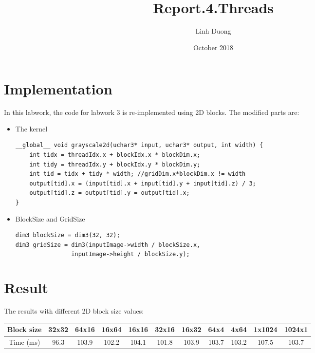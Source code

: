 \documentclass{article}
\title{Report.4.Threads}
\author{Linh Duong}
\date{October 2018}
\begin{document}
\maketitle

\section{Implementation}
In this labwork, the code for labwork 3 is re-implemented using 2D blocks. The modified parts are:

\begin{itemize}
    \item The kernel
    \begin{verbatim}
__global__ void grayscale2d(uchar3* input, uchar3* output, int width) {
    int tidx = threadIdx.x + blockIdx.x * blockDim.x;
    int tidy = threadIdx.y + blockIdx.y * blockDim.y;
    int tid = tidx + tidy * width; //gridDim.x*blockDim.x != width
    output[tid].x = (input[tid].x + input[tid].y + input[tid].z) / 3;
    output[tid].z = output[tid].y = output[tid].x;
}
    \end{verbatim}
    \item BlockSize and GridSize
    \begin{verbatim}
dim3 blockSize = dim3(32, 32);
dim3 gridSize = dim3(inputImage->width / blockSize.x,
                inputImage->height / blockSize.y);
    \end{verbatim}
\end{itemize}

\section{Result}
The results with different 2D block size values:
\begin{table}[h]
\centering
\begin{tabular}{|c|c|c|c|c|c|c|c|c|c|c|}
\hline
Block size &32x32 &64x16 &16x64 & 16x16  & 32x16  & 16x32 & 64x4 & 4x64 & 1x1024 & 1024x1 \\ \hline
Time (ms)  & 96.3 & 103.9 & 102.2 & 104.1 & 101.8   & 103.9   & 103.7  & 103.2  & 107.5 & 103.7  \\
\hline
\end{tabular}
\end{table}
\end{document}
